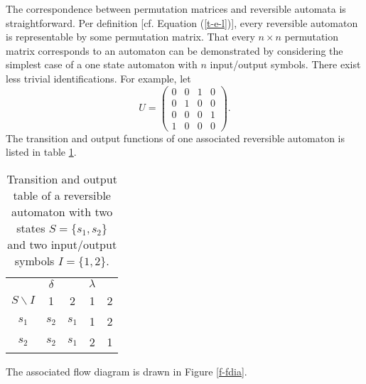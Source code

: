 \documentclass[pra,amsfonts,twocolumn]{revtex4}
\begin{document}
The correspondence between permutation matrices and
reversible automata is straightforward. Per definition [cf. Equation
(\ref{t-e-l})], every reversible automaton is representable by some
permutation matrix. That every $n\times n$ permutation matrix
corresponds to an automaton can be demonstrated by
considering the simplest
case of a one state automaton with $n$ input/output symbols.
There exist less trivial identifications. For example,
let $$  {U}=
\left(
\begin{array}{cccc}
0&0&1&0\\
0&1&0&0\\
0&0&0&1\\
1&0&0&0
\end{array}
\right).
$$
The transition and output functions of one associated reversible
automaton is listed in table
\ref{t-ra}.
\begin{table}
\begin{center}
\begin{tabular}{|c|cc|cc|}
 \hline
 \hline
 &$\delta$ & & $\lambda$&\\
$S\backslash I$ &1&2& 1&2\\
 \hline
$s_1$&$s_2$&$s_1$ & 1&2\\
$s_2$&$s_2$&$s_1 $& 2&1\\
 \hline
 \hline
\end{tabular}
\end{center}
\caption{Transition and output table of a reversible
automaton with two states $S=\{s_1, s_2\}$ and two input/output
symbols $I= \{1,2\}$.\label{t-ra}}
\end{table}
The associated flow diagram is drawn in Figure \ref{f-fdia}.
\end{document}
